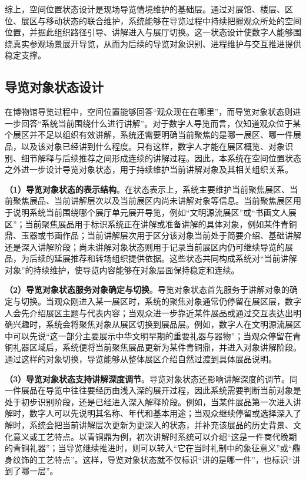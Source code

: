 综上，空间位置状态设计是现场导览情境维护的基础层。通过对展馆、楼层、区位、展区与移动状态的联合维护，系统能够在导览过程中持续把握观众所处的空间位置，并据此组织路径引导、讲解进入与展厅切换。这一状态设计使数字人能够围绕真实参观场景展开导览，从而为后续的导览对象识别、进程维护与交互推进提供稳定支撑。

\subsection{导览对象状态设计}
在博物馆导览过程中，空间位置能够回答“观众现在在哪里”，而导览对象状态则进一步回答“系统当前围绕什么进行讲解”。对于数字人导览而言，仅知道观众位于某个展区并不足以组织有效讲解，系统还需要明确当前聚焦的是哪一展区、哪一件展品，以及该对象已经讲到什么程度。只有这样，数字人才能在展区概览、对象识别、细节解释与后续推荐之间形成连续的讲解过程。因此，本系统在空间位置状态之外进一步设计导览对象状态，用于持续维护当前讲解对象及其相关组织关系。

\textbf{（1）导览对象状态的表示结构}。在状态表示上，系统主要维护当前聚焦展区、当前聚焦展品、当前讲解层次以及当前展区内尚未讲解对象等信息。当前聚焦展区用于说明系统当前围绕哪个展厅单元展开导览，例如“文明源流展区”或“书画文人展区”；当前聚焦展品用于标识系统正在讲解或准备讲解的具体对象，例如某件青铜鼎、玉器或书画作品；当前讲解层次用于区分该对象当前处于简要介绍、基础讲解还是深入讲解阶段；尚未讲解对象状态则用于记录当前展区内仍可继续导览的展品，为后续的延展推荐和转场组织提供依据。这些状态共同构成系统对“当前讲解对象”的持续维护，使导览内容能够在对象层面保持稳定和连续。

\textbf{（2）导览对象状态服务对象确定与切换}。导览对象状态首先服务于讲解对象的确定与切换。当观众刚进入某一展区时，系统的聚焦对象通常仍停留在展区层，数字人会先介绍展区主题与代表内容；当观众进一步靠近某件展品或通过交互表达出明确兴趣时，系统会将聚焦对象从展区切换到展品层。例如，数字人在文明源流展区中可以先说“这一部分主要展示中华文明早期的重要礼器与器物”；当观众停留在青铜礼器区域后，系统便将当前聚焦展品更新为某件青铜鼎，并进入对象讲解阶段。通过这样的对象切换，导览能够从整体展区介绍自然过渡到具体展品说明。

\textbf{（3）导览对象状态支持讲解深度调节}。导览对象状态还影响讲解深度的调节。同一件展品在导览中往往要经历由浅入深的展开过程，因此系统需要判断当前对象是处于初步识别阶段，还是已经进入深入解释阶段。例如，当某件展品第一次进入讲解时，数字人可以先说明其名称、年代和基本用途；当观众继续停留或选择深入了解时，系统会把当前讲解层次更新为更深入的状态，并补充该展品的历史背景、文化意义或工艺特点。以青铜鼎为例，初次讲解时系统可以介绍“这是一件商代晚期的青铜礼器”；当导览继续推进时，则可以转入“它在当时礼制中的象征意义”或“鼎身纹饰的工艺特点”。这样，导览对象状态就不仅标识“讲的是哪一件”，也标识“讲到了哪一层”。

